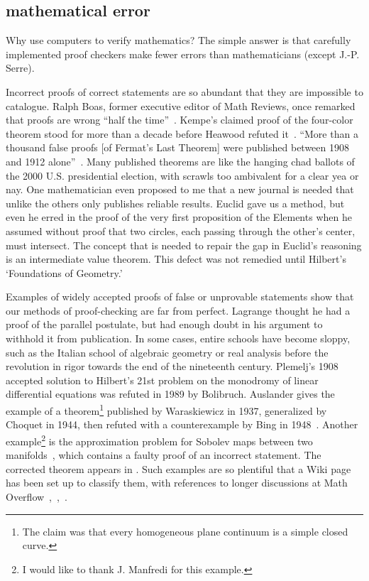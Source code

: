 \documentclass{llncs}
\begin{document}

\subsection{mathematical error}

Why use computers to verify mathematics?  The simple answer is that
carefully implemented proof checkers make fewer errors than
mathematicians (except J.-P. Serre).

Incorrect proofs of correct statements are so abundant that they are
impossible to catalogue.  Ralph Boas, former executive editor of Math
Reviews, once remarked that proofs are wrong ``half the
time''~\cite{Aus}. Kempe's claimed proof of the four-color theorem
stood for more than a decade before Heawood refuted
it~\cite[p.~115]{Mac}.  ``More than a thousand false proofs [of
Fermat's Last Theorem] were published between 1908 and 1912
alone''~\cite{Corry}.  Many published theorems are like the hanging
chad ballots of the 2000 U.S. presidential election, with scrawls too
ambivalent for a clear yea or nay.  One mathematician even proposed to
me that a new journal is needed that unlike the others only publishes
reliable results.  Euclid gave us a method, but even he erred in the
proof of the very first proposition of the Elements when he assumed
without proof that two circles, each passing through the other's
center, must intersect.  The concept that is needed to repair the gap
in Euclid's reasoning is an intermediate value theorem.  This defect
was not remedied until Hilbert's `Foundations of Geometry.'

Examples of widely accepted proofs of false or unprovable statements
show that our methods of proof-checking are far from perfect.
Lagrange thought he had a proof of the parallel postulate, but had
enough doubt in his argument to withhold it from publication.  In some
cases, entire schools have become sloppy, such as the Italian school
of algebraic geometry or real analysis before the revolution in rigor
towards the end of the nineteenth century.  Plemelj's 1908 accepted
solution to Hilbert's 21st problem on the monodromy of linear
differential equations was refuted in 1989 by Bolibruch.  Auslander
gives the example of a theorem\footnote{The claim was that every
  homogeneous plane continuum is a simple closed curve.}  published by
Waraskiewicz in 1937, generalized by Choquet in 1944, then refuted
with a counterexample by Bing in 1948~\cite{Aus}.  Another
example\footnote{I would like to thank J. Manfredi for this example.}
is the approximation problem for Sobolev maps between two
manifolds~\cite{Bethuel}, which contains a faulty proof of an
incorrect statement.  The corrected theorem appears in \cite{Hang}.
Such examples are so plentiful that a Wiki page has been set up to
classify them, with references to longer discussions at Math
Overflow~\cite{WikiPIP},~\cite{Over2},~\cite{Over1}.
\end{document}
